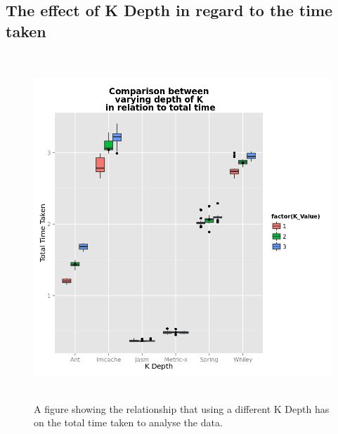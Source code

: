 \documentclass[11pt
              , a4paper
              , twoside
              , openright
              ]{report}
\begin{document}
\begin{appendices}
\chapter{The effect of K Depth in regard to the time taken}
\begin{figure}[h]
\centering
\includegraphics[width=\textwidth,height=13cm]{KDepthTime.png}
\caption{A figure showing the relationship that using a different K Depth has on the total time taken to analyse the data.}
\label{fig:kdepthtime}
\end{figure}


\end{appendices}
\end{document}
